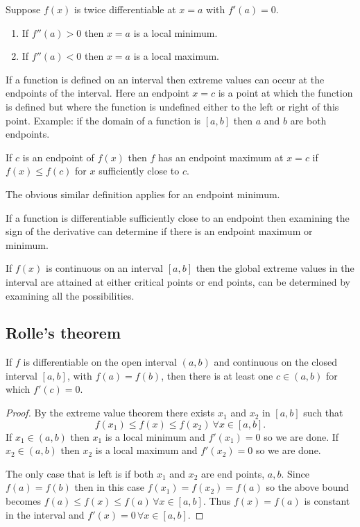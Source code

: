 \documentclass[10pt, a4paper]{article}
\begin{document}
Suppose $f(x)$ is twice differentiable at $x = a$ with $f'(a) = 0$.
\begin{enumerate}[label = (\roman*)]
    \item If $f''(a) > 0$ then $x = a$ is a local minimum.
    \item If $f''(a) < 0$ then $x = a$ is a local maximum.
\end{enumerate}

If a function is defined on an interval then extreme values can occur at the endpoints of the interval. Here an endpoint $x = c$ is a point at which the function is defined but where the function is undefined either to the left or right of this point. Example: if the domain of a function is $[a, b]$ then $a$ and $b$ are both endpoints.

\begin{definition}
    If $c$ is an endpoint of $f(x)$ then $f$ has an endpoint maximum at $x = c$ if $f(x) \leq f(c)$ for $x$ sufficiently close to $c$.
\end{definition}

The obvious similar definition applies for an endpoint minimum.

If a function is differentiable sufficiently close to an endpoint then examining the sign of the derivative can determine if there is an endpoint maximum or minimum.

If $f(x)$ is continuous on an interval $[a, b]$ then the global extreme values in the interval are attained at either critical points or end points, can be determined by examining all the possibilities.

\subsection{Rolle's theorem}
\begin{theorem}\label{pre:calc:thm:rolle}
    If $f$ is differentiable on the open interval $(a, b)$ and continuous on the closed interval $[a, b]$, with $f(a) = f(b)$,
    then there is at least one $c \in (a, b)$ for which $f'(c) = 0$.
    \begin{proof}
        By the extreme value theorem there exists $x_1$ and $x_2$ in $[a, b]$ such that
        \[
        f(x_1) \leq f(x) \leq f(x_2)\ \forall x \in [a, b].
        \]
        If $x_1 \in (a, b)$ then $x_1$ is a local minimum and $f'(x_1) = 0$ so we are done.
        If $x_2 \in (a, b)$ then $x_2$ is a local maximum and $f'(x_2) = 0$ so we are done.
    
        The only case that is left is if both $x_1$ and $x_2$ are end points, $a, b$.
        Since $f(a) = f(b)$ then in this case $f(x_1) = f(x_2) = f(a)$ so the above bound becomes $f(a) \leq f(x) \leq f(a)\, \forall x \in [a, b]$.
        Thus $f(x) = f(a)$ is constant in the interval and $f'(x) = 0\, \forall x \in [a, b]$.
    \end{proof}
\end{theorem}
\end{document}
